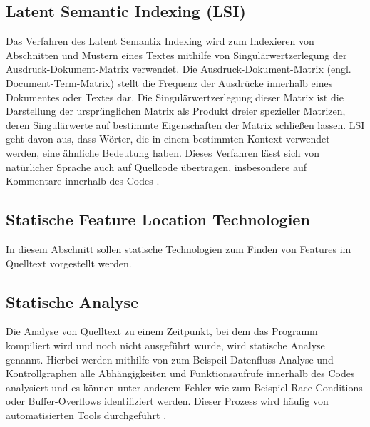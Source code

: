 \documentclass[runningheads,a4paper]{llncs}
\begin{document}
\subsection*{Latent Semantic Indexing (LSI)}

Das Verfahren des Latent Semantix Indexing wird zum Indexieren von Abschnitten und Mustern eines Textes mithilfe von Singulärwertzerlegung der Ausdruck-Dokument-Matrix verwendet. Die Ausdruck-Dokument-Matrix (engl. Document-Term-Matrix) stellt die Frequenz der Ausdrücke innerhalb eines Dokumentes oder Textes dar. Die Singulärwertzerlegung dieser Matrix ist die Darstellung der ursprünglichen Matrix als Produkt dreier spezieller Matrizen, deren Singulärwerte auf bestimmte Eigenschaften der Matrix schließen lassen. LSI geht davon aus, dass Wörter, die in einem bestimmten Kontext verwendet werden, eine ähnliche Bedeutung haben. Dieses Verfahren lässt sich von natürlicher Sprache auch auf Quellcode übertragen, insbesondere auf Kommentare innerhalb des Codes \cite{LSI}.




\subsection{Statische Feature Location Technologien}

In diesem Abschnitt sollen statische Technologien zum Finden von Features im Quelltext vorgestellt werden.

\subsection*{Statische Analyse}

Die Analyse von Quelltext zu einem Zeitpunkt, bei dem das Programm kompiliert wird und noch nicht ausgeführt wurde, wird statische Analyse genannt. Hierbei werden mithilfe von zum Beispeil Datenfluss-Analyse und Kontrollgraphen alle Abhängigkeiten und Funktionsaufrufe innerhalb des Codes analysiert und es können unter anderem Fehler wie zum Beispiel Race-Conditions oder Buffer-Overflows identifiziert werden. Dieser Prozess wird häufig von automatisierten Tools durchgeführt \cite{static}.
\end{document}
